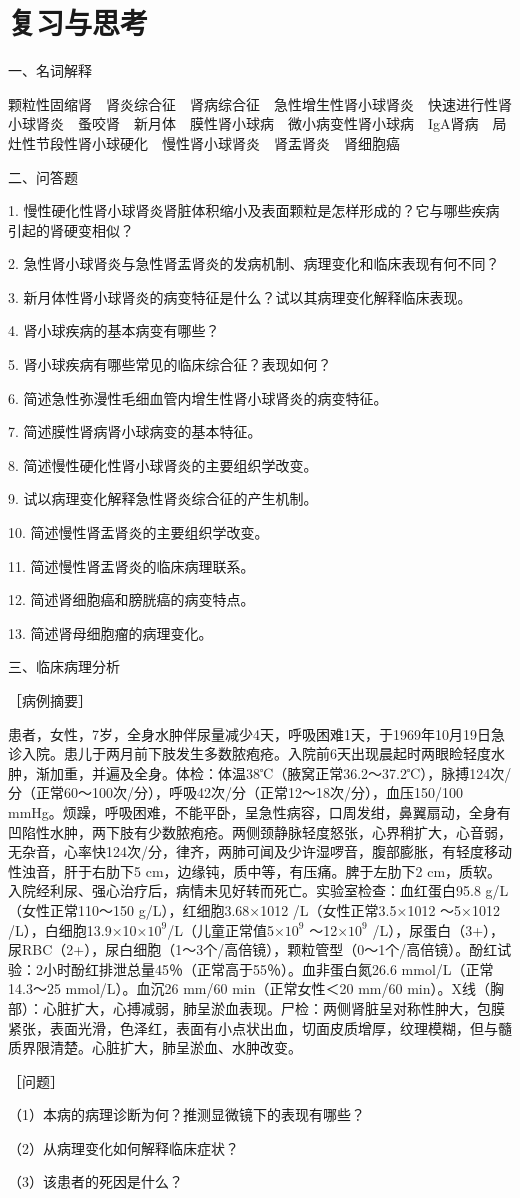 \section*{复习与思考}

{一、名词解释}

颗粒性固缩肾　肾炎综合征　肾病综合征　急性增生性肾小球肾炎　快速进行性肾小球肾炎　蚤咬肾　新月体　膜性肾小球病　微小病变性肾小球病　IgA肾病　局灶性节段性肾小球硬化　慢性肾小球肾炎　肾盂肾炎　肾细胞癌

{二、问答题}

1.
慢性硬化性肾小球肾炎肾脏体积缩小及表面颗粒是怎样形成的？它与哪些疾病引起的肾硬变相似？

2. 急性肾小球肾炎与急性肾盂肾炎的发病机制、病理变化和临床表现有何不同？

3. 新月体性肾小球肾炎的病变特征是什么？试以其病理变化解释临床表现。

4. 肾小球疾病的基本病变有哪些？

5. 肾小球疾病有哪些常见的临床综合征？表现如何？

6. 简述急性弥漫性毛细血管内增生性肾小球肾炎的病变特征。

7. 简述膜性肾病肾小球病变的基本特征。

8. 简述慢性硬化性肾小球肾炎的主要组织学改变。

9. 试以病理变化解释急性肾炎综合征的产生机制。

10. 简述慢性肾盂肾炎的主要组织学改变。

11. 简述慢性肾盂肾炎的临床病理联系。

12. 简述肾细胞癌和膀胱癌的病变特点。

13. 简述肾母细胞瘤的病理变化。

{三、临床病理分析}

［病例摘要］

患者，女性，7岁，全身水肿伴尿量减少4天，呼吸困难1天，于1969年10月19日急诊入院。患儿于两月前下肢发生多数脓疱疮。入院前6天出现晨起时两眼睑轻度水肿，渐加重，并遍及全身。体检：体温38℃（腋窝正常36.2～37.2℃），脉搏124次/分（正常60～100次/分），呼吸42次/分（正常12～18次/分），血压150/100
mmHg。烦躁，呼吸困难，不能平卧，呈急性病容，口周发绀，鼻翼扇动，全身有凹陷性水肿，两下肢有少数脓疱疮。两侧颈静脉轻度怒张，心界稍扩大，心音弱，无杂音，心率快124次/分，律齐，两肺可闻及少许湿啰音，腹部膨胀，有轻度移动性浊音，肝于右肋下5
cm，边缘钝，质中等，有压痛。脾于左肋下2
cm，质软。入院经利尿、强心治疗后，病情未见好转而死亡。实验室检查：血红蛋白95.8
g/L（女性正常110～150 g/L），红细胞3.68×10{12} /L（女性正常3.5×10{12}
～5×10{12} /L），白细胞13.9×10$\times 10^{9}$/L（儿童正常值5$\times 10^{9}$
～12$\times 10^{9}$
/L），尿蛋白（3+），尿RBC（2+），尿白细胞（1～3个/高倍镜），颗粒管型（0～1个/高倍镜）。酚红试验：2小时酚红排泄总量45％（正常高于55％）。血非蛋白氮26.6
mmol/L（正常14.3～25 mmol/L）。血沉26 mm/60 min（正常女性＜20 mm/60
min）。X线（胸部）：心脏扩大，心搏减弱，肺呈淤血表现。尸检：两侧肾脏呈对称性肿大，包膜紧张，表面光滑，色泽红，表面有小点状出血，切面皮质增厚，纹理模糊，但与髓质界限清楚。心脏扩大，肺呈淤血、水肿改变。

［问题］

（1）本病的病理诊断为何？推测显微镜下的表现有哪些？

（2）从病理变化如何解释临床症状？

（3）该患者的死因是什么？
